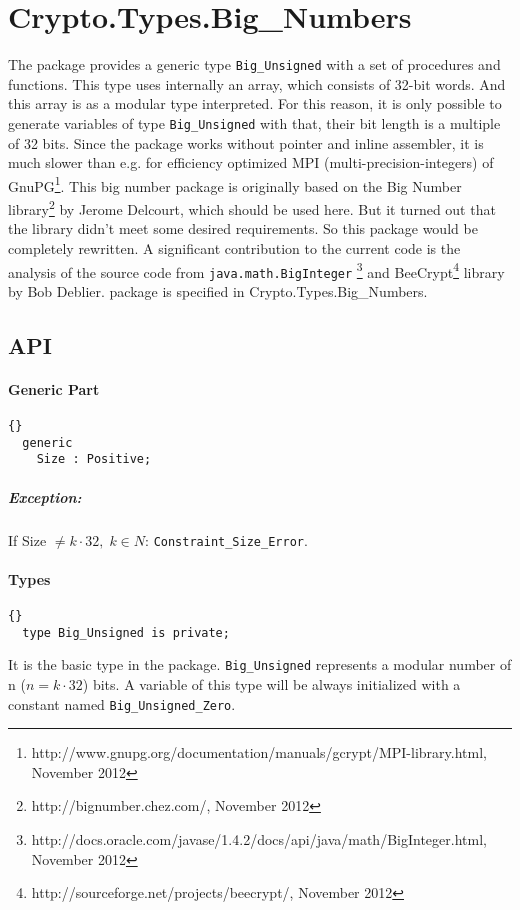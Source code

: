 \chapter{Crypto.Types.Big\_Numbers}
The package provides a generic type \texttt{Big\_Unsigned} with a set
of procedures and functions. This type uses internally an array, which
consists of 32-bit words. And this array is as a modular type
interpreted. For this reason, it is only possible to generate
variables of type \texttt{Big\_Unsigned} with that, their bit length
is a multiple of 32 bits. Since the package works without pointer and
inline assembler, it is much slower than e.g. for efficiency optimized
MPI (multi-precision-integers) of
GnuPG\footnote{http://www.gnupg.org/documentation/manuals/gcrypt/MPI-library.html,
  November 2012}. This big number package is originally based on the
Big Number library\footnote{http://bignumber.chez.com/, November 2012}
by Jerome Delcourt, which should be used here. But it turned out that
the library didn't meet some desired requirements. So this package
would be completely rewritten. A significant contribution to the
current code is the analysis of the source code from
\texttt{java.math.BigInteger}
\footnote{http://docs.oracle.com/javase/1.4.2/docs/api/java/math/BigInteger.html,
  November 2012} and
BeeCrypt\footnote{http://sourceforge.net/projects/beecrypt/, November
  2012} library by Bob Deblier.%
package is specified in Crypto.Types.Big\_Numbers.

\section{API}
\subsubsection*{Generic Part}
\begin{lstlisting}{}
  generic
    Size : Positive;
\end{lstlisting}
\paragraph{Exception:} If Size $\not= k \cdot 32,\; k \in N$:\quad
\texttt{Constraint\_Size\_Error}.
\newpage

\subsubsection*{Types}
\begin{lstlisting}{}
  type Big_Unsigned is private;
\end{lstlisting}
It is the basic type in the package. \texttt{Big\_Unsigned} represents
a modular number of n ($n = k \cdot 32$) bits. A variable of this type
will be always initialized with a constant named
\texttt{Big\_Unsigned\_Zero}.


